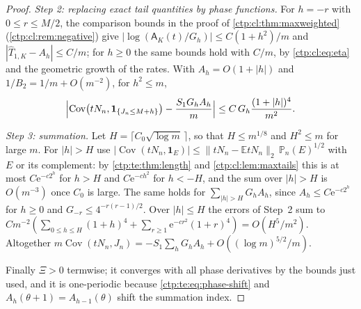 \documentclass[11pt,a4paper]{article}
\numberwithin{equation}{section}
\theoremstyle{definition}
\theoremstyle{remark}
\newcommand{\e}{\mathrm e}
\newcommand{\PP}{\mathbb P}
\newcommand{\E}{\mathbb E}
\DeclareMathOperator{\Cov}{Cov}
\newcommand{\ind}{\mathbf 1}
\newcommand{\amp}{\mathsf A}
\begin{document}
\begin{proof}
\emph{Step 2: replacing exact tail quantities by phase functions.} For
$h=-r$ with $0\le r\le M/2$, the comparison bounds in the proof of
\cref{ctp:cl:thm:maxweighted} (\cref{ctp:cl:rem:negative}) give
$|\log(\amp_K(t)/G_h)|\le C(1+h^2)/m$ and
$|\widehat T_{1,K}-A_h|\le C/m$; for $h\ge0$ the same bounds hold with
$C/m$, by \eqref{ctp:cl:eq:eta} and the geometric growth of the rates. With
$A_h=O(1+|h|)$ and $1/B_2=1/m+O(m^{-2})$, for $h^2\le m$,
\[
 \Bigl|\Cov\bigl(tN_n,\ind_{\{J_n\le M+h\}}\bigr)-\frac{S_1G_hA_h}m\Bigr|
 \le C\,G_h\frac{(1+|h|)^4}{m^2}.
\]

\emph{Step 3: summation.} Let $H=\lceil C_0\sqrt{\log m}\,\rceil$, so that
$H\le m^{1/8}$ and $H^2\le m$ for large $m$. For $|h|>H$ use
$|\Cov(tN_n,\ind_E)|\le\|tN_n-\E tN_n\|_2\,\PP_n(E)^{1/2}$ with $E$ or its
complement: by \cref{ctp:te:thm:length} and \cref{ctp:cl:lem:maxtails} this
is at most $C\e^{-c2^h}$ for $h>H$ and $C\e^{-ch^2}$ for $h<-H$, and the sum
over $|h|>H$ is $O(m^{-3})$ once $C_0$ is large. The same holds for
$\sum_{|h|>H}G_hA_h$, since $A_h\le C\e^{-c2^h}$ for $h\ge0$ and
$G_{-r}\le4^{-r(r-1)/2}$. Over $|h|\le H$ the errors of Step~2 sum to
$Cm^{-2}(\sum_{0\le h\le H}(1+h)^4+\sum_{r\ge1}\e^{-cr^2}(1+r)^4)=O(H^5/m^2)$.
Altogether
$m\Cov(tN_n,J_n)=-S_1\sum_hG_hA_h+O((\log m)^{5/2}/m)$.

Finally $\Xi>0$ termwise; it converges with all phase derivatives by the
bounds just used, and it is one-periodic because \eqref{ctp:te:eq:phase-shift}
and $A_h(\theta+1)=A_{h-1}(\theta)$ shift the summation index.
\end{proof}
\end{document}
